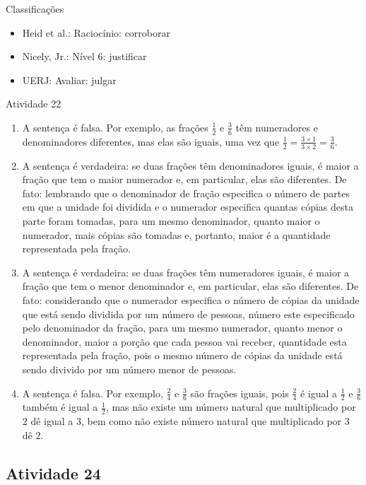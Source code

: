 \documentclass[oneside]{book}
\begin{document}
\begin{multicols}{2}
Classificações
\begin{itemize} %
  \item Heid et al.: Raciocínio: corroborar
  \item Nicely, Jr.: Nível 6: justificar
  \item UERJ: Avaliar: julgar
\end{itemize}


\begin{resposta*}{Atividade 22}
\begin{enumerate} [\quad a)] %
    \item A sentença é falsa. Por exemplo, as frações $\frac{1}{2}$ e 
$\frac{3}{6}$ têm numeradores e denominadores diferentes, mas elas são iguais, 
uma vez que $\frac{1}{2} = \frac{3 \times 1}{3 \times 2} = \frac{3}{6}$.
    \item A sentença é verdadeira: se duas frações têm denominadores iguais, é 
maior a fração que tem o maior numerador e, em particular, elas são diferentes. 
De fato: lembrando que o denominador de fração especifica o número de partes em 
que a unidade foi dividida e o numerador especifica quantas cópias desta parte 
foram tomadas, para um mesmo denominador, quanto maior o numerador, mais cópias 
são tomadas e, portanto, maior é a quantidade representada pela fração.
    \item  A sentença é verdadeira: se duas frações têm numeradores iguais, é 
maior a fração que tem o menor denominador e, em particular, elas são 
diferentes. De fato: considerando que o numerador especifica o número de cópias 
da unidade que está sendo dividida por um número de pessoas, número este 
especificado pelo denominador da fração, para um mesmo numerador, quanto menor o 
denominador, maior a porção que cada pessoa vai receber, quantidade esta 
representada pela fração, pois o mesmo número de cópias da unidade está sendo 
divivido por um número menor de pessoas.
    \item A sentença é falsa. Por exemplo, $\frac{2}{4}$ e $\frac{3}{6}$ são 
frações iguais, pois $\frac{2}{4}$ é igual a $\frac{1}{2}$ e $\frac{3}{6}$ 
também é igual a $\frac{1}{2}$, mas não existe um número natural que 
multiplicado por $2$ dê igual a $3$, bem como não existe número natural que 
multiplicado por $3$ dê $2$.
\end{enumerate}
\end{resposta*}

\subsection{Atividade 24}


\end{multicols}
\end{document}
